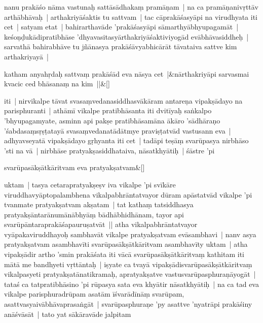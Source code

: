 \documentclass[article,12pt,a4paper]{memoir}%
\newcounter{parCount}
\begin{document}
	  
	  \pstart \leavevmode%
	\label{thakur75-132.21}nanu prakāśo nāma vastunaḥ sattāsādhakaṃ pramāṇam | na ca pramāṇanivṛttāv arthābhāvaḥ | arthakriyāśaktis tu sattvam | tac cāprakāśasyāpi na virudhyata iti cet | satyam etat | bahirarthavāde 'prakāśasyāpi sāmarthyābhyupagamāt | keśoṇḍukādipratibhāse 'dhyavasitasyārthakriyāśaktiviyogād evābhāvasiddheḥ | sarvathā bahirabhāve tu jñānasya prakāśāvyabhicārāt tāvataiva sattve kim arthakriyayā | 
	{}
	\pend%
      
	    
	    \stanza[\smallbreak]
	  katham anyahṛdaḥ sattvaṃ prakāśād eva nāsya cet |&nārthakriyāpi sarvasmai kvacic ced bhāsanaṃ na kim ||\&[\smallbreak]
	  
	  
	  

	  
	  \pstart \leavevmode%
	iti | nirvikalpe tāvat svasaṃvedanasiddhasvākāram antareṇa vipakṣādayo na parisphuranti | athāmī vikalpe pratibhāsanta iti dvitīyaḥ saṅkalpo 'bhyupagamyate, asminn api pakṣe pratibhāsamāna ākāro 'sādhāraṇo 'śabdasaṃsṛṣṭatayā svasaṃvedanatādātmye praviṣṭatvād vastusann eva | \label{thakur75-132.32} adhyavseyatā vipakṣādayo gṛhyanta iti cet | tadāpi teṣāṃ svarūpasya nirbhāso 'sti na vā | nirbhāse pratyakṣasiddhataiva, nāsatkhyātiḥ | śāstre 'pi
	{}
	\pend%
      
	    
	    \stanza[\smallbreak]
	  svarūpasākṣātkāritvam eva pratyakṣatvam\&[\smallbreak]
	  
	  
	  

	  
	  \pstart \leavevmode%
	uktam | tasya cetarapratyakṣeṣv iva vikalpe 'pi svīkāre viruddhavyāptopalambhena vikalpabhrāntatvayor dūram apāstatvād vikalpe 'pi tvanmate pratyakṣatvam akṣatam | tat kathaṃ tatsiddhasya pratyakṣāntarānumānābhyāṃ bādhābhidhānam, tayor api svarūpāntaraprakāśapauruṣatvāt || \label{thakur75-133.5} atha vikalpabhrāntatvayor vyāpakaviruddhayoḥ sambhavāt vikalpe pratyakṣatvam evāsambhavi | nanv asya pratyakṣatvam asambhavīti svarūpasākṣātkāritvam asambhavīty uktam | atha vipakṣādir artho 'smin prakāśata iti vācā svarūpasākṣātkāritvaṃ kathitam iti mātā me bandhyeti vṛttāntaḥ | iṣyate ca tvayā vipakṣādisvarūpasākṣātkāritvaṃ vikalpasyeti pratyakṣatānatikramaḥ, apratyakṣatve vastusvarūpasphuraṇāyogāt | tataś ca tatpratibhāsino 'pi rūpasya sata eva khyātir nāsatkhyātiḥ | na ca tad eva vikalpe parisphuradrūpam asatām īśvarādīnāṃ svarūpam, asattvasyaivābhāvaprasaṅgāt | svarūpasphuraṇe 'py asattve 'nyatrāpi prakāśiny anāśvāsāt | tato yat sākāravāde jalpitam
	{}
	\pend%
      
\end{document}
